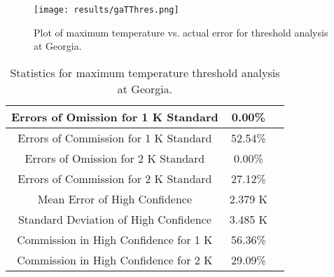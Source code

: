\documentclass{book}
\begin{document}
\begin{minipage}[c]{0.47\textwidth}
\centering
\begin{figure}[H]
\texttt{[image: results/gaTThres.png]}
\caption{Plot of maximum temperature vs. actual error for threshold analysis at Georgia.}
\label{fig:gaTThres}
\end{figure}
\end{minipage}
\begin{minipage}[c]{0.47\textwidth}
\begin{table}[H]
\centering
\footnotesize
\begin{tabular}{ | c | c | c | } \hline
Errors of Omission for 1 K Standard & 0.00\% \\ \hline
Errors of Commission for 1 K Standard & 52.54\% \\ \hline
Errors of Omission for 2 K Standard & 0.00\% \\ \hline
Errors of Commission for 2 K Standard & 27.12\% \\ \hline
Mean Error of High Confidence & 2.379 K \\ \hline
Standard Deviation of High Confidence & 3.485 K \\ \hline
Commission in High Confidence for 1 K & 56.36\% \\ \hline
Commission in High Confidence for 2 K & 29.09\% \\ \hline
\end{tabular}
\caption{Statistics for maximum temperature threshold analysis at Georgia.}
\label{tab:gaTThres}
\end{table}
\end{minipage}
\end{document}
